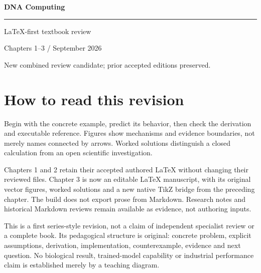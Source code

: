 \documentclass[11pt,oneside,openany]{book}
\begin{document}
\frontmatter
\begin{titlepage}
\color{BookBlue}\sffamily\vspace*{24mm}
{\fontsize{36}{42}\selectfont\bfseries DNA Computing\par}
\vspace{12mm}{\Large Molecular representation, physical computation, and evidence\par}
\vspace{14mm}\rule{\linewidth}{.8pt}\par
\vspace{7mm}{\large Define the mechanism. Derive the result. Test the claim.\par}
\vfill{\large LaTeX-first textbook review\par}
\vspace{5mm}Chapters 1--3 / September 2026\par
New combined review candidate; prior accepted editions preserved.
\end{titlepage}
\chapter*{How to read this revision}
Begin with the concrete example, predict its behavior, then check the derivation
and executable reference. Figures show mechanisms and evidence boundaries,
not merely names connected by arrows. Worked solutions distinguish a closed
calculation from an open scientific investigation.

Chapters 1 and 2 retain their accepted authored LaTeX without changing their
reviewed files. Chapter 3 is now an editable LaTeX manuscript, with its original
vector figures, worked solutions and a new native TikZ bridge from the preceding
chapter. The build does not export prose from Markdown. Research notes and
historical Markdown reviews remain available as evidence, not authoring inputs.

This is a first series-style revision, not a claim of independent specialist
review or a complete book. Its pedagogical structure is original: concrete
problem, explicit assumptions, derivation, implementation, counterexample,
evidence and next question. No biological result, trained-model capability or
industrial performance claim is established merely by a teaching diagram.

\tableofcontents
\mainmatter



\backmatter



\printindex
\end{document}
